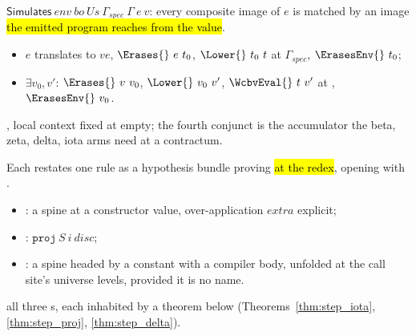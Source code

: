 \begin{definition}
\label{def:Simulates}
\leanok
{}
 $\mathsf{Simulates}\ env\ bo\ Us\ \Gamma_{spec}\ \Gamma\ e\ v$: every composite \lbox{}
image of $e$ is matched by an image \hl{the emitted program reaches from the value}.
\begin{itemize}
\item {} $e$ translates to $ve$, $\Erases{}\ e\ t_0$, $\Lower{}\ t_0\ t$ at $\Gamma_{spec}$,
$\ErasesEnv{}\ t_0$;
\item {} $\exists v_0, v'$: $\Erases{}\ v\ v_0$, $\Lower{}\ v_0\ v'$,
$\WcbvEval{}\ t\ v'$ at , $\ErasesEnv{}\ v_0$.
\end{itemize}
 , local context fixed at empty; the fourth conjunct is the accumulator the
beta, zeta, delta, iota arms need at a contractum.
\end{definition}

\begin{definition}
\label{def:StepIota}
\leanok
{}
 Each restates one \SEval{} rule as a hypothesis bundle proving \hl{ at
the redex}, opening with .
\begin{itemize}
\item {}: a  spine at a constructor value, over-application $extra$ explicit;
\item {}: $\mathtt{proj}\ S\ i\ disc$;
\item {}: a spine headed by a constant with a compiler body, unfolded at the call site's
universe levels, provided it is no  name.
\end{itemize}
 all three s, each inhabited by a theorem below (Theorems~\ref{thm:step_iota},
\ref{thm:step_proj}, \ref{thm:step_delta}).
\end{definition}

